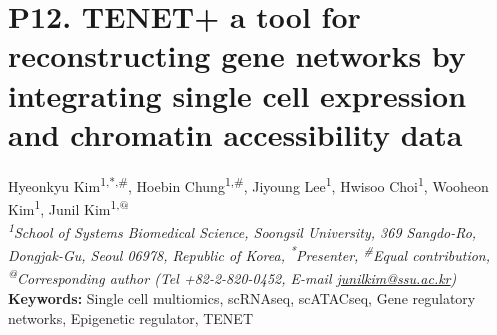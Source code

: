 
\section*{P12. TENET+ a tool for reconstructing gene networks by integrating single cell expression and chromatin accessibility data}

\begin{center}
Hyeonkyu Kim\textsuperscript{1,*,\#}, Hoebin Chung\textsuperscript{1,\#}, Jiyoung Lee\textsuperscript{1}, Hwisoo Choi\textsuperscript{1}, Wooheon Kim\textsuperscript{1}, Junil Kim\textsuperscript{1,@} \\
\vspace{0.2cm}
\textit{\textsuperscript{1}School of Systems Biomedical Science, Soongsil University, 369 Sangdo-Ro, Dongjak-Gu, Seoul 06978, Republic of Korea, \textsuperscript{*}Presenter, \textsuperscript{\#}Equal contribution, \textsuperscript{@}Corresponding author (Tel +82-2-820-0452, E-mail \href{mailto:junilkim@ssu.ac.kr}{junilkim@ssu.ac.kr})} \\
\vspace{0.2cm}
\textbf{Keywords:} Single cell multiomics, scRNAseq, scATACseq, Gene regulatory networks, Epigenetic regulator, TENET
\end{center}

